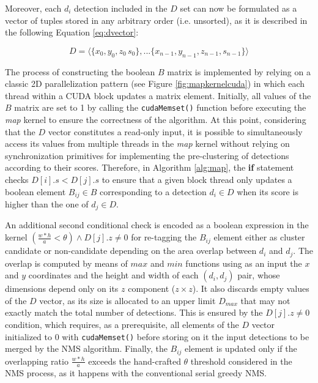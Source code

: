 Moreover, each $d_i$ detection included in the $D$ set can now be formulated as a vector of tuples stored in any arbitrary 
order (i.e. unsorted), as it is described in the following Equation \ref{eq:dvector}:

\begin{equation}
\label{eq:dvector}
D = \langle \{ x_0, y_0, z_0\, s_0 \}, ... \{ x_{n-1}, y_{n-1}, z_{n-1}, s_{n-1} \} \rangle
\end{equation}

\bigbreak

The process of constructing the boolean $B$ matrix is implemented by relying on a classic 2D parallelization 
pattern (see Figure \ref{fig:mapkernelcuda}) in which each thread within a CUDA block updates a matrix element. Initially, all values 
of the $B$ matrix are set to 1 by calling the \small\texttt{cudaMemset()} \normalsize function before executing the \emph{map} kernel to 
ensure the correctness of the algorithm. At this point, considering that the $D$ vector constitutes a read-only input, it is possible to 
simultaneously access its values from multiple threads in the \emph{map} kernel without relying on synchronization primitives for implementing 
the pre-clustering of detections according to their scores. Therefore, in Algorithm \ref{alg:map}, the \textbf{if} statement 
checks $D[i].s < D[j].s$ to ensure that a given block thread only updates a boolean element $B_{ij} \in B$ corresponding to a 
detection $d_i \in D$ when its score is higher than the one of $d_j \in D$.

An additional second conditional check is encoded as a boolean expression in the kernel $(\frac{w*h}{a} < \theta) \wedge D[j].z \neq 0$ for 
re-tagging the $B_{ij}$ element either as cluster candidate or non-candidate depending on the area overlap between $d_i$ and $d_j$. 
The overlap is computed by means of $max$ and $min$ functions using as an input the $x$ and $y$ coordinates and the height and width of each 
$(d_i,d_j)$ pair, whose dimensions depend only on its $z$ component ($z \times z$). It also discards empty values of the $D$ vector, as its 
size is allocated to an upper limit $D_{max}$ that may not exactly match the total number of detections. This is ensured by the $D[j].z \neq 0$ 
condition, which requires, as a prerequisite, all elements of the $D$ vector initialized to 0 with \small\texttt{cudaMemset()} \normalsize before 
storing on it the input detections to be merged by the NMS algorithm. Finally, the $B_{ij}$ element is updated only if the overlapping 
ratio $\frac{w*h}{a}$ exceeds the hand-crafted $\theta$ threshold considered in the NMS process, as it happens with the conventional serial greedy NMS.

